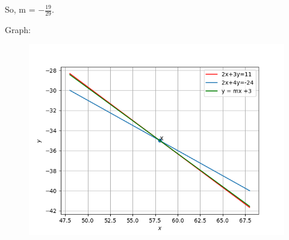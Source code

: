 \documentclass[journal,12pt,onecolumn]{IEEEtran}
\begin{document}
		So, m = $-\frac{19}{29}$.


Graph:
\begin{figure}[h!]
	\centering
	\includegraphics[width=\linewidth]{img.png}
\end{figure}	
\end{document}
